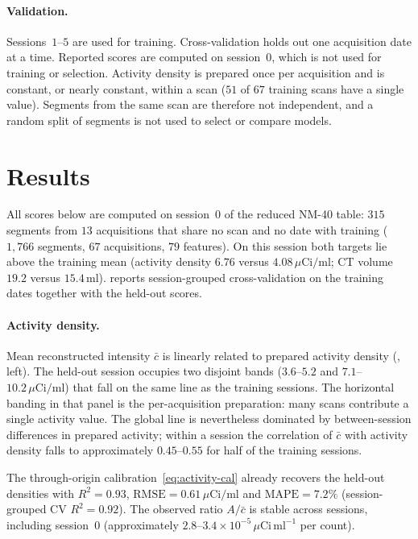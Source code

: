\paragraph{Validation.}
Sessions~$1$--$5$ are used for training.
Cross-validation holds out one acquisition date at a time.
Reported scores are computed on session~$0$, which is not used for training or selection.
Activity density is prepared once per acquisition and is constant, or nearly constant, within a scan ($51$ of $67$ training scans have a single value).
Segments from the same scan are therefore not independent, and a random split of segments is not used to select or compare models.

\section{Results}

All scores below are computed on session~$0$ of the reduced NM-40 table: $315$ segments from $13$ acquisitions that share no scan and no date with training ($1{,}766$ segments, $67$ acquisitions, $79$ features).
On this session both targets lie above the training mean (activity density $6.76$ versus $4.08\,\mu\mathrm{Ci/ml}$; CT volume $19.2$ versus $15.4\,\mathrm{ml}$).
 reports session-grouped cross-validation on the training dates together with the held-out scores.

\paragraph{Activity density.}
Mean reconstructed intensity $\bar{c}$ is linearly related to prepared activity density (, left).
The held-out session occupies two disjoint bands ($3.6$--$5.2$ and $7.1$--$10.2\,\mu\mathrm{Ci/ml}$) that fall on the same line as the training sessions.
The horizontal banding in that panel is the per-acquisition preparation: many scans contribute a single activity value.
The global line is nevertheless dominated by between-session differences in prepared activity; within a session the correlation of $\bar{c}$ with activity density falls to approximately $0.45$--$0.55$ for half of the training sessions.

The through-origin calibration~\eqref{eq:activity-cal} already recovers the held-out densities with $R^2=0.93$, $\mathrm{RMSE}=0.61\,\mu\mathrm{Ci/ml}$ and $\mathrm{MAPE}=7.2\%$ (session-grouped CV $R^2=0.92$).
The observed ratio $A/\bar{c}$ is stable across sessions, including session~$0$ (approximately $2.8$--$3.4\times 10^{-5}\,\mu\mathrm{Ci\,ml^{-1}}$ per count).

